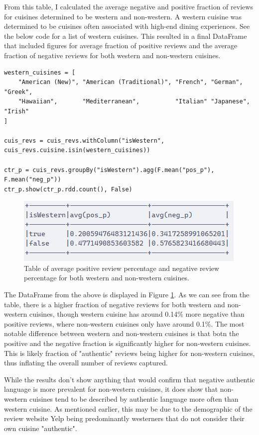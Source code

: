 From this table, I calculated the average negative and positive fraction of reviews for cuisines determined to be western and non-western. A western cuisine was determined to be cuisines often associated with high-end dining experiences. See the below code for a list of western cuisines. This resulted in a final DataFrame that included figures for average fraction of positive reviews and the average fraction of negative reviews for both western and non-western cuisines.

\begin{verbatim}
western_cuisines = [
    "American (New)", "American (Traditional)", "French", "German",   "Greek",
    "Hawaiian",       "Mediterranean",          "Italian" "Japanese", "Irish"
]

cuis_revs = cuis_revs.withColumn("isWestern", cuis_revs.cuisine.isin(western_cuisines))

ctr_p = cuis_revs.groupBy("isWestern").agg(F.mean("pos_p"), F.mean("neg_p"))
ctr_p.show(ctr_p.rdd.count(), False)
\end{verbatim}

\begin{figure}
    \centering
    \includegraphics[width=0.5\linewidth]{images/finalpscores.png}
    \caption{Table of average positive review percentage and negative review percentage for both western and non-western cuisines.}
    \label{fig:finalpscores}
\end{figure} 

The DataFrame from the above is displayed in Figure \ref{fig:finalpscores}. As we can see from the table, there is a higher fraction of negative reviews for both western and non-western cuisines, though western cuisine has around 0.14\% more negative than positive reviews, where non-western cuisines only have around 0.1\%. The most notable difference between western and non-western cuisines is that botn the positive and the negative fraction is significantly higher for non-western cuisines. This is likely fraction of "authentic" reviews being higher for non-western cuisines, thus inflating the overall number of reviews captured.

While the results don't show anything that would confirm that negative authentic language is more prevalent for non-western cuisines, it does show that non-western cuisines tend to be described by authentic language more often than western cuisine. As mentioned earlier, this may be due to the demographic of the review website Yelp being predominantly westerners that do not consider their own cuisine "authentic".


